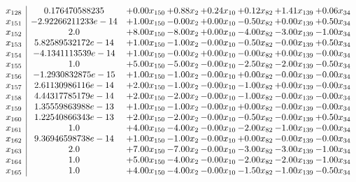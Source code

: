 \documentclass[8pt]{article}
\begin{document}
\[\begin{array}{c| c c@{\hskip 2pt} c@{\hskip 2pt} c@{\hskip 2pt} c@{\hskip 2pt} c@{\hskip 2pt} c@{\hskip 2pt} }
 x_{128}   &  0.176470588235 & +  0.00 x_{150} & +  0.88 x_{2} & +  0.24 x_{10} & +  0.12 x_{82} & +  1.41 x_{139} & +  0.06 x_{34}\\
 x_{151}   &  -2.92266211233e-14 & +  1.00 x_{150} & -0.00 x_{2} & +  0.00 x_{10} & -0.50 x_{82} & +  0.00 x_{139} & +  0.50 x_{34}\\
 x_{152}   &  2.0 & +  8.00 x_{150} & -8.00 x_{2} & +  0.00 x_{10} & -4.00 x_{82} & -3.00 x_{139} & -1.00 x_{34}\\
 x_{153}   &  5.82589532172e-14 & +  1.00 x_{150} & -1.00 x_{2} & -0.00 x_{10} & -0.50 x_{82} & -0.00 x_{139} & +  0.50 x_{34}\\
 x_{154}   &  -4.1341113539e-14 & +  1.00 x_{150} & -0.00 x_{2} & +  0.00 x_{10} & -0.00 x_{82} & +  0.00 x_{139} & -0.00 x_{34}\\
 x_{155}   &  1.0 & +  5.00 x_{150} & -5.00 x_{2} & -0.00 x_{10} & -2.50 x_{82} & -2.00 x_{139} & -0.50 x_{34}\\
 x_{156}   &  -1.2930832875e-15 & +  1.00 x_{150} & -1.00 x_{2} & -0.00 x_{10} & +  0.00 x_{82} & -0.00 x_{139} & -0.00 x_{34}\\
 x_{157}   &  2.61130986116e-14 & +  2.00 x_{150} & -1.00 x_{2} & -0.00 x_{10} & -1.00 x_{82} & +  0.00 x_{139} & -0.00 x_{34}\\
 x_{158}   &  4.44317785179e-14 & +  2.00 x_{150} & -2.00 x_{2} & -0.00 x_{10} & -1.00 x_{82} & -0.00 x_{139} & -0.00 x_{34}\\
 x_{159}   &  1.35559863988e-13 & +  1.00 x_{150} & -1.00 x_{2} & -0.00 x_{10} & +  0.00 x_{82} & -0.00 x_{139} & -0.00 x_{34}\\
 x_{160}   &  1.22540866343e-13 & +  2.00 x_{150} & -2.00 x_{2} & -0.00 x_{10} & -0.50 x_{82} & -0.00 x_{139} & +  0.50 x_{34}\\
 x_{161}   &  1.0 & +  4.00 x_{150} & -4.00 x_{2} & -0.00 x_{10} & -2.00 x_{82} & -1.00 x_{139} & -0.00 x_{34}\\
 x_{162}   &  9.36946598738e-14 & +  1.00 x_{150} & -1.00 x_{2} & -0.00 x_{10} & +  0.00 x_{82} & -0.00 x_{139} & -0.00 x_{34}\\
 x_{163}   &  2.0 & +  7.00 x_{150} & -7.00 x_{2} & -0.00 x_{10} & -3.00 x_{82} & -3.00 x_{139} & -1.00 x_{34}\\
 x_{164}   &  1.0 & +  5.00 x_{150} & -4.00 x_{2} & -0.00 x_{10} & -2.00 x_{82} & -2.00 x_{139} & -1.00 x_{34}\\
 x_{165}   &  1.0 & +  4.00 x_{150} & -4.00 x_{2} & -0.00 x_{10} & -1.50 x_{82} & -1.00 x_{139} & -0.50 x_{34}\\

\end{array}\]
\end{document}
